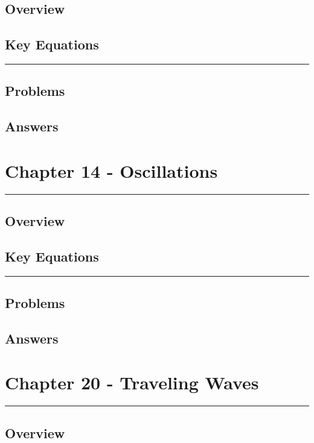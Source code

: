 \documentclass[a4paper,12pt]{article}
\begin{document}
\subsection*{Overview}
\subsection*{Key Equations}

\begin{center}
  \rule{6cm}{0.5pt}
\end{center}
\subsection*{Problems}
\subsection*{Answers}

\pagebreak
\section*{Chapter 14 - Oscillations}
\rule{\linewidth}{1pt}
\subsection*{Overview}
\subsection*{Key Equations}

\begin{center}
  \rule{6cm}{0.5pt}
\end{center}
\subsection*{Problems}
\subsection*{Answers}

\pagebreak
\section*{Chapter 20 - Traveling Waves}
\rule{\linewidth}{1pt}
\subsection*{Overview}
\end{document}
